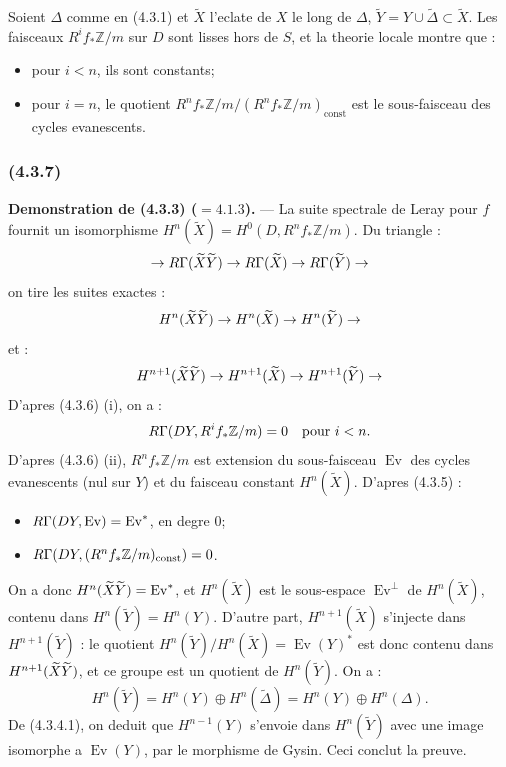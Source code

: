 \documentclass[12pt,a4paper]{article}
\theoremstyle{plain}
\theoremstyle{definition}
\theoremstyle{remark}
\newcommand{\const}{\text{const}}
\DeclareMathOperator{\Ev}{Ev}
\let\mod\relax
\DeclareMathOperator{\mod}{mod}
\newcommand{\bbZ}{\mathbb{Z}}
\begin{document}
Soient $\Delta$ comme en (4.3.1) et $\widetilde{X}$ l'eclate de $X$ le long de $\Delta$, $\widetilde{Y} = Y \cup \widetilde{\Delta} \subset \widetilde{X}$. Les faisceaux $R^i f_* \bbZ/m$ sur $D$ sont lisses hors de $S$, et la theorie locale montre que :
\begin{itemize}
\item[(i)] pour $i < n$, ils sont constants;
\item[(ii)] pour $i = n$, le quotient $R^n f_* \bbZ/m / (R^n f_* \bbZ/m)_{\const}$ est le sous-faisceau des cycles evanescents.
\end{itemize}

\subsubsection*{\textup{(4.3.7)}}

\textbf{Demonstration de (4.3.3) ($=4.1.3$).} --- La suite spectrale de Leray pour $f$ fournit un isomorphisme $H^n(\widetilde{X}) = H^0(D, R^n f_* \bbZ/m)$. Du triangle :
\[
\to R\Gamma(\widetilde{X} \mod \widetilde{Y}) \to R\Gamma(\widetilde{X}) \to R\Gamma(\widetilde{Y}) \to
\]
on tire les suites exactes :
\[
H^n(\widetilde{X} \mod \widetilde{Y}) \to H^n(\widetilde{X}) \to H^n(\widetilde{Y}) \to
\]
et :
\[
H^{n+1}(\widetilde{X} \mod \widetilde{Y}) \to H^{n+1}(\widetilde{X}) \to H^{n+1}(\widetilde{Y}) \to
\]
D'apres (4.3.6) (i), on a :
\[
R\Gamma(D \mod Y, R^i f_* \bbZ/m) = 0 \quad \text{pour } i < n.
\]
D'apres (4.3.6) (ii), $R^n f_* \bbZ/m$ est extension du sous-faisceau $\Ev$ des cycles evanescents (nul sur $Y$) et du faisceau constant $H^n(\widetilde{X})$. D'apres (4.3.5) :
\begin{itemize}
\item[(i)] $R\Gamma(D \mod Y, \Ev) = \Ev^*$, en degre $0$;
\item[(ii)] $R\Gamma(D \mod Y, (R^n f_* \bbZ/m)_{\const}) = 0$.
\end{itemize}
On a donc $H^n(\widetilde{X} \mod \widetilde{Y}) = \Ev^*$, et $H^n(\widetilde{X})$ est le sous-espace $\Ev^\perp$ de $H^n(\widetilde{X})$, contenu dans $H^n(\widetilde{Y}) = H^n(Y)$. D'autre part, $H^{n+1}(\widetilde{X})$ s'injecte dans $H^{n+1}(\widetilde{Y})$ : le quotient $H^n(\widetilde{Y}) / H^n(\widetilde{X}) = \Ev(Y)^*$ est donc contenu dans $H^{n+1}(\widetilde{X} \mod \widetilde{Y})$, et ce groupe est un quotient de $H^n(\widetilde{Y})$. On a :
\[
H^n(\widetilde{Y}) = H^n(Y) \oplus H^n(\widetilde{\Delta}) = H^n(Y) \oplus H^n(\Delta).
\]
De (4.3.4.1), on deduit que $H^{n-1}(Y)$ s'envoie dans $H^n(\widetilde{Y})$ avec une image isomorphe a $\Ev(Y)$, par le morphisme de Gysin. Ceci conclut la preuve.
\end{document}
